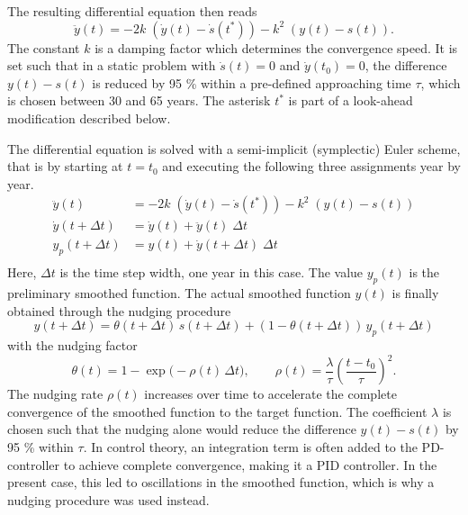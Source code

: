 The resulting differential equation then reads
\begin{equation} \label{eq:pd_acc}
    \ddot{y}(t) = - 2k\; (\dot{y}(t) - \dot{s}(t^*)) - k^2\;(y(t)-s(t)).
\end{equation}
The constant $k$ is a damping factor which determines the convergence speed. It is set such that in a static problem with $\dot{s}(t)=0$ and $\dot{y}(t_{0})=0$, the difference $y(t)-s(t)$ is reduced by 95 \% within a pre-defined approaching time $\tau$, which is chosen between 30 and 65 years. The asterisk $t^*$ is part of a look-ahead modification described below.

The differential equation is solved with a semi-implicit (symplectic) Euler scheme, that is by starting at $t=t_{0}$ and executing the following three assignments year by year.
\begin{equation}
\begin{split}
    \ddot{y}(t) &= - 2k\; (\dot{y}(t) - \dot{s}(t^*)) - k^2\;(y(t)-s(t)) \\
    \dot{y}(t+\Delta t) &= \dot{y}(t) + \ddot{y}(t) \; \Delta t \\
    y_p(t+\Delta t) &= y(t) + \dot{y}(t+\Delta t) \; \Delta t \\
\end{split}
\end{equation}
Here, $\Delta t$ is the time step width, one year in this case. The value $y_p(t)$ is the preliminary smoothed function. The actual smoothed function $y(t)$ is finally obtained through the nudging procedure
\begin{equation}
    y(t+\Delta t) = \theta(t+\Delta t)\, s(t+\Delta t) + (1-\theta(t+\Delta t))\, y_p(t+\Delta t)
\end{equation}
with the nudging factor
\begin{equation}
    \theta(t) = 1 - \exp\big(-\rho(t)\,\Delta t\big), \qquad
    \rho(t) = \frac{\lambda}{\tau} \left(\frac{t-t_{0}}{\tau}\right)^2.
\end{equation}
The nudging rate $\rho(t)$ increases over time to accelerate the complete convergence of the smoothed function to the target function. The coefficient $\lambda$ is chosen such that the nudging alone would reduce the difference $y(t)-s(t)$ by 95 \% within $\tau$. In control theory, an integration term is often added to the PD-controller to achieve complete convergence, making it a PID controller. In the present case, this led to oscillations in the smoothed function, which is why a nudging procedure was used instead.

